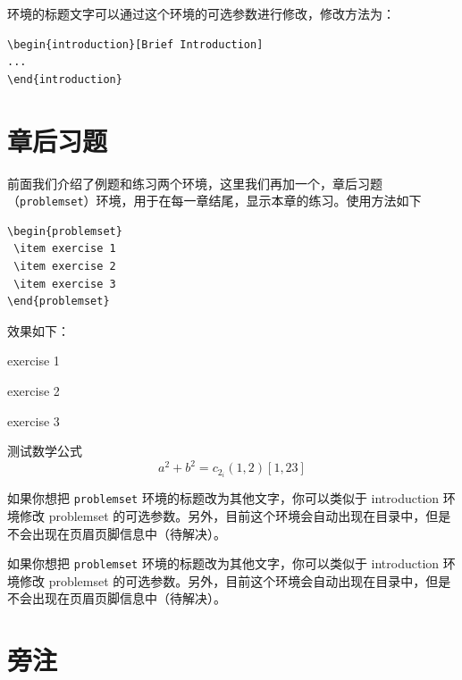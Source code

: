 \documentclass[lang=cn,newtx,10pt,scheme=chinese,pad,twocol]{zznote}
\begin{document}
环境的标题文字可以通过这个环境的可选参数进行修改，修改方法为：
\begin{lstlisting}
\begin{introduction}[Brief Introduction]
...
\end{introduction}
\end{lstlisting}

\section{章后习题}
前面我们介绍了例题和练习两个环境，这里我们再加一个，章后习题（\lstinline{problemset}）环境，用于在每一章结尾，显示本章的练习。使用方法如下

\begin{lstlisting}
\begin{problemset}
 \item exercise 1
 \item exercise 2
 \item exercise 3
\end{problemset}
\end{lstlisting}


效果如下：
\begin{problemset}[我的题目]
	\item exercise 1
	\item exercise 2
	\item exercise 3
	\item 测试数学公式
	\begin{equation}
		a^2+b^2=c_{2_{i}} (1,2) [1,23]
	\end{equation}
\end{problemset}

\begin{remark}
	如果你想把 \lstinline{problemset} 环境的标题改为其他文字，你可以类似于 introduction 环境修改 problemset 的可选参数。另外，目前这个环境会自动出现在目录中，但是不会出现在页眉页脚信息中（待解决）。
\end{remark}

\begin{solution}
	如果你想把 \lstinline{problemset} 环境的标题改为其他文字，你可以类似于 introduction 环境修改 problemset 的可选参数。另外，目前这个环境会自动出现在目录中，但是不会出现在页眉页脚信息中（待解决）。
\end{solution}

\section{旁注}
\end{document}
